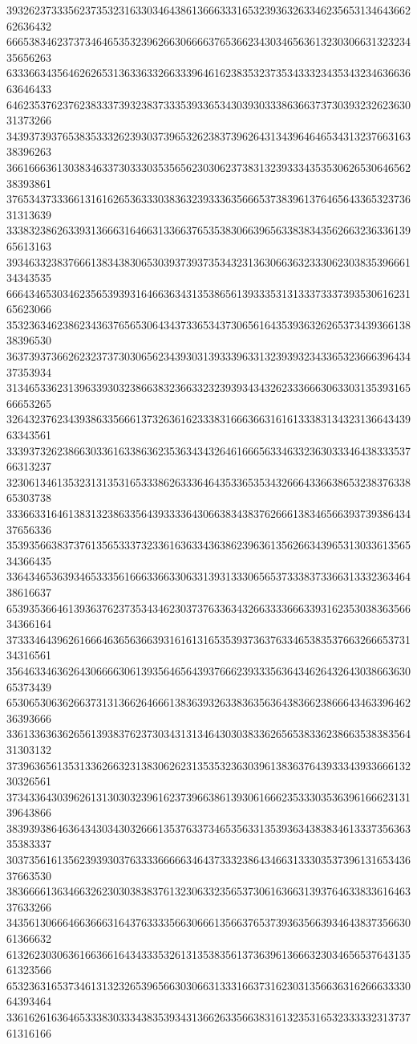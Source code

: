 39326237333562373532316330346438613666333165323936326334623565313464366262636432
66653834623737346465353239626630666637653662343034656361323030663132323435656263
63336634356462626531363363326633396461623835323735343332343534323463663663646433
64623537623762383337393238373335393365343039303338636637373039323262363031373266
34393739376538353332623930373965326238373962643134396464653431323766316338396263
36616663613038346337303330353565623030623738313239333435353062653064656238393861
37653437333661316162653633303836323933363566653738396137646564336532373631313639
33383238626339313666316466313366376535383066396563383834356266323633613965613163
39346332383766613834383065303937393735343231363066363233306230383539666134343535
66643465303462356539393164663634313538656139333531313337333739353061623165623066
35323634623862343637656530643437336534373065616435393632626537343936613838396530
36373937366262323737303065623439303139333963313239393234336532366639643437353934
31346533623139633930323866383236633232393934343262333666306330313539316566653265
32643237623439386335666137326361623338316663663161613338313432313664343963343561
33393732623866303361633863623536343432646166656334633236303334643833353766313237
32306134613532313135316533386263336464353365353432666433663865323837633865303738
33366331646138313238633564393333643066383438376266613834656639373938643437656336
35393566383737613565333732336163633436386239636135626634396531303361356534366435
33643465363934653335616663366330633139313330656537333837336631333236346438616637
65393536646139363762373534346230373763363432663333666339316235303836356634366164
37333464396261666463656366393161613165353937363763346538353766326665373134316561
35646334636264306666306139356465643937666239333563643462643264303866363065373439
65306530636266373131366264666138363932633836356364383662386664346339646236393666
33613363636265613938376237303431313464303038336265653833623866353838356431303132
37396365613531336266323138306262313535323630396138363764393334393366613230326561
37343364303962613130303239616237396638613930616662353330353639616662313139643866
38393938646364343034303266613537633734653563313539363438383461333735636335383337
30373561613562393930376333366666346437333238643466313330353739613165343637663530
38366661363466326230303838376132306332356537306163663139376463383361646337633266
34356130666466366631643763333566306661356637653739363566393464383735663061366632
61326230306361663661643433353261313538356137363961366632303465653764313561323566
65323631653734613132326539656630306631333166373162303135663631626663333064393464
33616261636465333830333438353934313662633566383161323531653233333231373761316166
